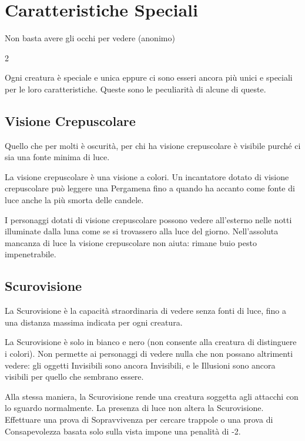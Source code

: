 \section{Caratteristiche Speciali}

\begin{enfasi}{
Non basta avere gli occhi per vedere (anonimo)
}\end{enfasi}

\begin{multicols}{2}

Ogni creatura è speciale e unica eppure ci sono esseri ancora più unici e speciali per le loro caratteristiche. Queste sono le peculiarità di alcune di queste.

\subsection{Visione Crepuscolare}\label{visionecrepuscolare}

Quello che per molti è oscurità, per chi ha \hypertarget{visionecrepuscolare}{visione crepuscolare} è visibile purché ci sia una fonte minima di luce.

La visione crepuscolare è una visione a colori.
Un incantatore dotato di visione crepuscolare può leggere una Pergamena fino a quando ha accanto come fonte di luce anche la più smorta delle candele.

I personaggi dotati di visione crepuscolare possono vedere all'esterno nelle notti illuminate dalla luna come se si trovassero alla luce del giorno.
Nell'assoluta mancanza di luce la visione crepuscolare non aiuta: rimane buio pesto impenetrabile.

\subsection{Scurovisione}\label{scurovisione}

La Scurovisione è la capacità straordinaria di vedere senza fonti di luce, fino a una distanza massima indicata per ogni creatura.

La Scurovisione è solo in bianco e nero (non consente alla creatura di distinguere i colori). Non permette ai personaggi di vedere nulla che non possano altrimenti vedere: gli oggetti Invisibili sono ancora Invisibili, e le Illusioni sono ancora visibili per quello che sembrano essere.

Alla stessa maniera, la Scurovisione rende una creatura soggetta agli attacchi con lo sguardo normalmente. La presenza di luce non altera la Scurovisione.
Effettuare una prova di Sopravvivenza per cercare trappole o una prova di Consapevolezza basata solo sulla vista impone una penalità di -2.


\end{multicols}

